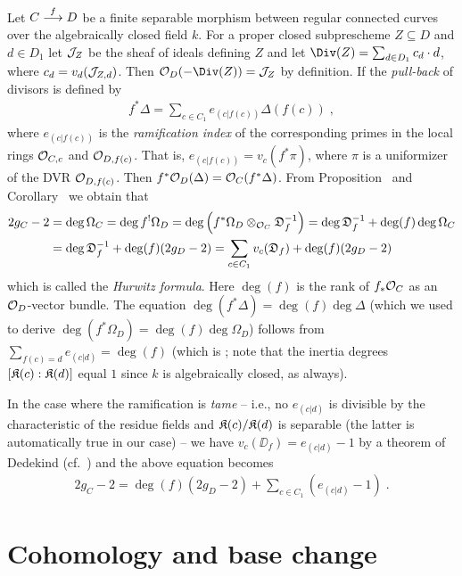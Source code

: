 \documentclass[a4paper,parskip=half,numbers=enddot, DIV=12]{scrreprt}
\begin{document}
\begin{rem*}
	Let $C\morphism[f]D$ be a finite separable morphism between regular connected curves over the algebraically closed field $k$. For a proper closed subprescheme $Z\subseteq D$ and $d\in D_1$ let $\mathcal{J}_Z$ be the sheaf of ideals defining $Z$ and let $\Div(Z)=\sum_{d\in D_1}c_d\cdot d$, where $c_d=v_d(\mathcal{J}_{Z,d})$. Then $\Oo_D(-\Div(Z))=\Jj_Z$ by definition. If the \emph{pull-back} of divisors is defined by
	\begin{align*}
		f^*\Delta=\sum_{c\in C_1}e_{(c| f(c))}\Delta(f(c))\;,
	\end{align*}
	where $e_{(c| f(c))}$ is the \emph{ramification index} of the corresponding primes in the local rings $\mathcal{O}_{C,c}$ and $\mathcal{O}_{D,f(c)}$. That is, $e_{(c|f(c))}=v_c(f^*\pi)$, where $\pi$ is a uniformizer of the DVR $\mathcal{O}_{D,f(c)}$. Then $f^*\mathcal{O}_D(\Delta)=\mathcal{O}_C(f^*\Delta)$. From Proposition~ and Corollary~ we obtain that
	\begin{align*}
		2g_C-2&=\deg\Omega_C=\deg f^!\Omega_D=\deg\left(f^*\Omega_D\otimes_{\mathcal{O}_C}\mathfrak{D}_f^{-1}\right)=\deg \mathfrak{D}_f^{-1}+\deg(f)\deg\Omega_C\\
		&=\deg \mathfrak{D}_f^{-1}+\deg(f)(2g_D-2)=\sum_{c\in C_1}v_c(\mathfrak{D}_f)+\deg(f)(2g_D-2)
	\end{align*}
	which is called the \emph{Hurwitz formula}. Here $\deg(f)$ is the rank of $f_*\mathcal{O}_C$ as an $\mathcal{O}_D$-vector bundle. The equation $\deg(f^*\Delta)=\deg(f)\deg\Delta$ (which we used to derive $\deg(f^*\Omega_D)=\deg(f)\deg\Omega_D$) follows from $\sum_{f(c)=d}e_{(c| d)}=\deg(f)$ (which is \cite[Ch.\ I, (8.2)]{NEUKIRCH}; note that the inertia degrees $[\mathfrak{K}(c):\mathfrak{K}(d)]$ equal $1$ since $k$ is algebraically closed, as always).
	
	In the case where the ramification is \emph{tame} -- i.e., no $e_{(c| d)}$ is divisible by the characteristic of the residue fields and $\mathfrak{K}(c)/\mathfrak{K}(d)$ is separable (the latter is automatically true in our case) -- we have $v_c(\DD_f)=e_{(c| d)}-1$ by a theorem of Dedekind (cf.\ \cite[Ch.\ III, (2.6)]{NEUKIRCH}) and the above equation becomes
	\begin{align*}
		2g_C-2=\deg(f)(2g_D-2)+\sum_{c\in C_1}\left(e_{(c| d)}-1\right)\;.
	\end{align*}
\end{rem*}
\chapter{Cohomology and base change}
\end{document}
